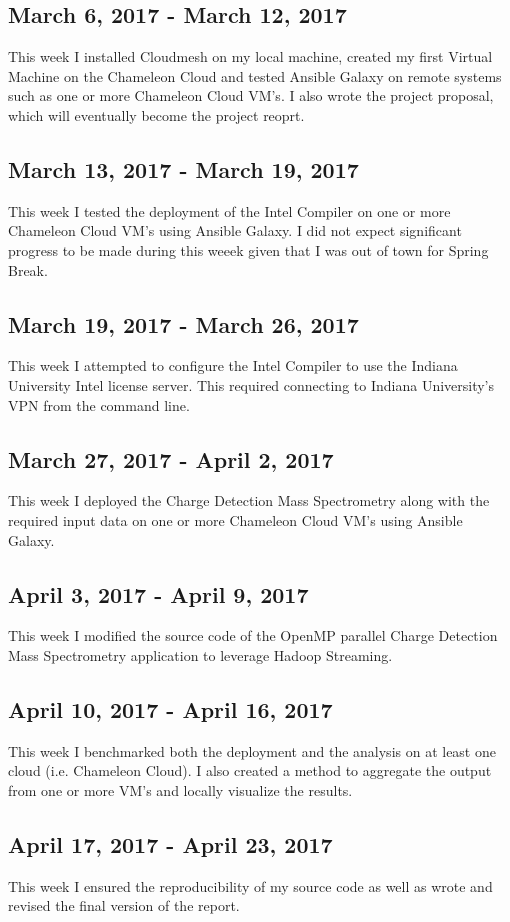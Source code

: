 \documentclass[9pt,twocolumn,twoside]{../../styles/osajnl}
\begin{document}
\subsection{March 6, 2017 - March 12, 2017}
This week I installed Cloudmesh on my local machine, created my first
Virtual Machine on the Chameleon Cloud and tested Ansible Galaxy on
remote systems such as one or more Chameleon Cloud VM's. I also wrote
the project proposal, which will eventually become the project reoprt.
\subsection{March 13, 2017 - March 19, 2017}
This week I tested the deployment of the Intel Compiler on one or more
Chameleon Cloud VM's using Ansible Galaxy. I did not expect
significant progress to be made during this weeek given that I was out
of town for Spring Break.
\subsection{March 19, 2017 - March 26, 2017}
This week I attempted to configure the Intel Compiler to use the
Indiana University Intel license server. This required connecting to
Indiana University's VPN from the command line.
\subsection{March 27, 2017 - April 2, 2017}
This week I deployed the Charge Detection Mass Spectrometry along with
the required input data on one or more Chameleon Cloud VM's using
Ansible Galaxy.
\subsection{April 3, 2017 - April 9, 2017}
This week I modified the source code of the OpenMP parallel Charge
Detection Mass Spectrometry application to leverage Hadoop Streaming.
\subsection{April 10, 2017 - April 16, 2017}
This week I benchmarked both the deployment and the analysis on at
least one cloud (i.e. Chameleon Cloud). I also created a method to
aggregate the output from one or more VM's and locally visualize the
results.
\subsection{April 17, 2017 - April 23, 2017}
This week I ensured the reproducibility of my source code as well as
wrote and revised the final version of the report.
\end{document}
